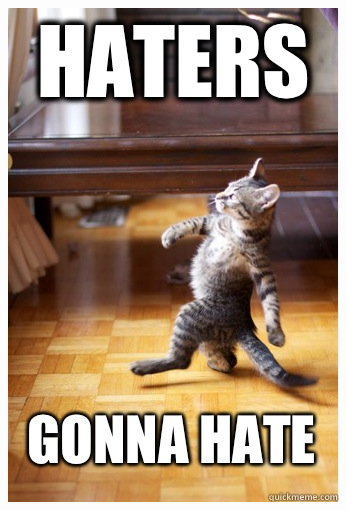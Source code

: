 \documentclass[12pt]{article}
\begin{document}
\begin{minipage}[c]{0.25\textwidth}
\includegraphics[width = \textwidth]{haters.jpg}
$\:$ \\
\end{minipage}
\end{document}
